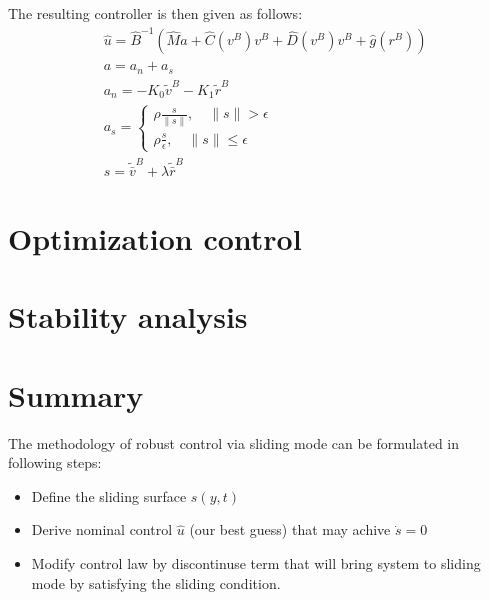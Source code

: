     The resulting controller is then given as follows:
    \begin{align*} 
        &\hat u = \hat{B}^{-1}(\hat{M}a + \hat{C}(v^B)v^B + \hat{D}(v^B)v^B + \hat{g}(r^B)) \\
        &a = a_n + a_s \\
        &a_n = - K_0\tilde{v}^B - K_1\tilde{r}^B \\
        &a_s = 
        \begin{cases}
        \rho \frac{s}{\|s\|}, \quad \|s\| >\epsilon\\
        \rho \frac{s}{\epsilon}, \quad \|s\| \leq\epsilon
        \end{cases} \\
        &s = \tilde{\bar{v}}^B + \lambda \tilde{\bar{r}}^B
    \end{align*}

\section{Optimization control}

\section{Stability analysis}


\section{Summary}


The methodology of robust control via sliding mode can be formulated in following steps:
\begin{itemize}
    \item Define the sliding surface $s(y, t)$
    \item Derive nominal control $\hat{u}$ (our best guess) that may achive $\dot{s} = 0$
    \item Modify control law by discontinuse term that will bring system to sliding mode
    by satisfying the sliding condition.
\end{itemize}



